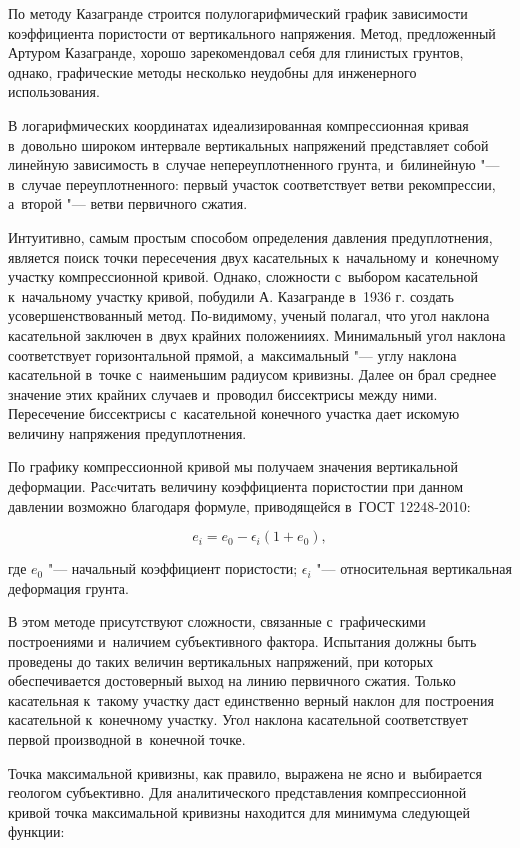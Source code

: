 По методу Казагранде строится полулогарифмический график зависимости коэффициента пористости от вертикального напряжения.  
Метод, предложенный Артуром Казагранде, хорошо зарекомендовал себя для глинистых грунтов, однако, графические методы несколько неудобны для инженерного использования.

В логарифмических координатах идеализированная компрессионная кривая в~довольно широком интервале вертикальных напряжений представляет собой линейную зависимость в~случае непереуплотненного грунта, и~билинейную "--- в~случае переуплотненного:
первый участок соответствует ветви рекомпрессии, а~второй "--- ветви первичного сжатия.

Интуитивно, самым простым способом определения давления предуплотнения, является поиск точки пересечения двух касательных к~начальному и~конечному участку компрессионной кривой. 
Однако, сложности с~выбором касательной к~начальному участку кривой, побудили А. Казагранде в~1936 г. создать усовершенствованный метод. 
По-видимому, ученый полагал, что угол наклона касательной заключен в~двух крайних положенииях. 
Минимальный угол наклона соответствует горизонтальной прямой, а~максимальный "--- углу наклона касательной в~точке с~наименьшим радиусом кривизны. 
Далее он брал среднее значение этих крайних случаев и~проводил биссектрисы между ними. 
Пересечение биссектрисы с~касательной конечного участка дает искомую величину напряжения предуплотнения.

По графику компрессионной кривой мы получаем значения вертикальной деформации. Расcчитать величину коэффициента пористостии при данном давлении возможно благодаря формуле, приводящейся в~ГОСТ 12248-2010:

$$e_i = e_0 - \epsilon_i (1+e_0),$$

где $e_0$ "--- начальный коэффициент пористости;
$\epsilon_i$ "--- относительная вертикальная деформация грунта.

В этом методе присутствуют сложности, связанные с~графическими построениями и~наличием субъективного фактора.
Испытания должны быть проведены до таких величин вертикальных напряжений, при которых обеспечивается достоверный выход на линию первичного сжатия. 
Только касательная к~такому участку даст единственно верный наклон для построения касательной к~конечному участку.
Угол наклона касательной соответствует первой производной в~конечной точке.

Точка максимальной кривизны, как правило, выражена не ясно и~выбирается геологом субъективно. Для аналитического представления компрессионной кривой точка максимальной кривизны находится для минимума следующей функции:

